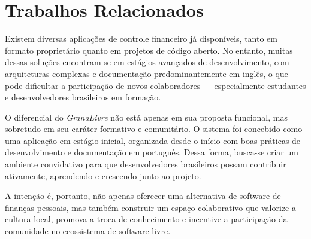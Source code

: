 \section{Trabalhos Relacionados}

Existem diversas aplicações de controle financeiro já disponíveis, tanto em formato proprietário quanto em projetos de código aberto. No entanto, muitas dessas soluções encontram-se em estágios avançados de desenvolvimento, com arquiteturas complexas e documentação predominantemente em inglês, o que pode dificultar a participação de novos colaboradores — especialmente estudantes e desenvolvedores brasileiros em formação.

O diferencial do \textit{GranaLivre} não está apenas em sua proposta funcional, mas sobretudo em seu caráter formativo e comunitário. O sistema foi concebido como uma aplicação em estágio inicial, organizada desde o início com boas práticas de desenvolvimento e documentação em português. Dessa forma, busca-se criar um ambiente convidativo para que desenvolvedores brasileiros possam contribuir ativamente, aprendendo e crescendo junto ao projeto.

A intenção é, portanto, não apenas oferecer uma alternativa de software de finanças pessoais, mas também construir um espaço colaborativo que valorize a cultura local, promova a troca de conhecimento e incentive a participação da comunidade no ecossistema de software livre.